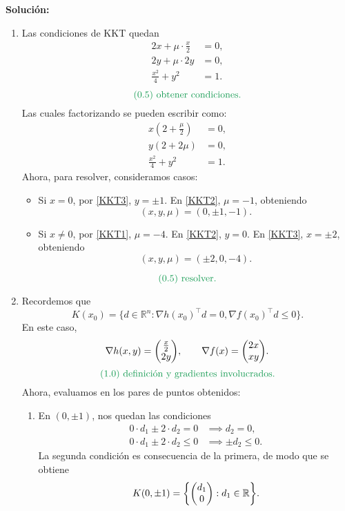 \documentclass{article}
\begin{document}
\begin{enumerate}
		\textbf{Solución:} 
		\begin{enumerate}
			\item Las condiciones de KKT quedan
		\begin{align*}
			2x + \mu \cdot \frac{x}{2} &= 0, \\
			2y + \mu \cdot 2y &= 0, \\
			\frac{x^2}{4} + y^2 &= 1.
		\end{align*}
		\[
			\text{\textcolor{ForestGreen}{(0.5) obtener condiciones.}}
		\]
		Las cuales factorizando se pueden escribir como:
		\begin{align}
			x \left(2 + \frac{\mu}{2}\right) &= 0, \label{KKT1} \\
			y (2 + 2 \mu) &= 0, \label{KKT2} \\
			\frac{x^2}{4} + y^2 &= 1. \label{KKT3}
		\end{align}
		Ahora, para resolver, consideramos casos:
		\begin{itemize}
			\item Si \(x = 0\), por \eqref{KKT3}, \(y = \pm 1\). En \eqref{KKT2}, \(\mu = -1\), obteniendo
				\[
					(x, y, \mu) = (0, \pm 1, -1).
				\]
			\item Si \(x \neq 0\), por \eqref{KKT1}, \(\mu = -4\). En \eqref{KKT2}, \(y = 0\). En \eqref{KKT3}, \(x = \pm 2\), obteniendo
				\[
					(x, y, \mu) = (\pm 2, 0, -4).
				\]
		\end{itemize}
		\[
			\text{\textcolor{ForestGreen}{(0.5) resolver.}}
		\]
	\item Recordemos que
		\[
			K(x_0) = \{ d \in \mathbb{R}^n : \nabla h(x_0)^\top d = 0, \nabla f(x_0)^\top d \leq 0\}.
		\]
		En este caso,
		\[
			\nabla h(x, y) = \mqty(\frac{x}{2} \\ 2y), \qquad \nabla f(x) = \mqty(2x \\ xy).
		\]
		\[
			\text{\textcolor{ForestGreen}{(1.0) definición y gradientes involucrados.}}
		\]
		Ahora, evaluamos en los pares de puntos obtenidos:
		\begin{enumerate}
			\item En \((0, \pm 1)\), nos quedan las condiciones
				\begin{align*}
					0 \cdot d_1 \pm 2 \cdot d_2 = 0 &\implies d_2 = 0, \\
					0 \cdot d_1 \pm 2 \cdot d_2 \leq 0 & \implies \pm d_2 \leq 0.
				\end{align*}
				La segunda condición es consecuencia de la primera, de modo que se obtiene
				\[
					K(0, \pm 1) = \qty{\mqty(d_1 \\ 0) : d_1 \in \mathbb{R}}.
\]
\end{enumerate}
\end{enumerate}
\end{enumerate}
\end{document}

